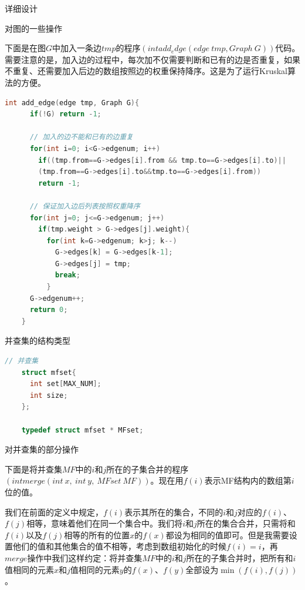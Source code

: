 \documentclass[UTF8]{ctexart}
\begin{document}
\begin{section}{详细设计}
\begin{subsection}{对图的一些操作}
\par{下面是在图$G$中加入一条边$tmp$的程序$(int add_edge(edge\ tmp, Graph\ G))$代码。需要注意的是，加入边的过程中，每次加不仅需要判断和已有的边是否重复，如果不重复、还需要加入后边的数组按照边的权重保持降序。这是为了运行Kruskal算法的方便。\\}

\begin{mdframed}[everyline=true]
\begin{lstlisting}[language=c]
    int add_edge(edge tmp, Graph G){
      if(!G) return -1;

      // 加入的边不能和已有的边重复
      for(int i=0; i<G->edgenum; i++)
        if((tmp.from==G->edges[i].from && tmp.to==G->edges[i].to)||
        (tmp.from==G->edges[i].to&&tmp.to==G->edges[i].from))
        return -1;

      // 保证加入边后列表按照权重降序
      for(int j=0; j<=G->edgenum; j++)
        if(tmp.weight > G->edges[j].weight){
          for(int k=G->edgenum; k>j; k--)
            G->edges[k] = G->edges[k-1];
            G->edges[j] = tmp;
            break;
          }
      G->edgenum++;
      return 0;
    }
\end{lstlisting}
\end{mdframed}

\end{subsection}

\begin{subsection}{并查集的结构类型}

\begin{mdframed}[everyline=true]
\begin{lstlisting}[language=c]
    // 并查集
    struct mfset{
      int set[MAX_NUM];
      int size;
    };

    typedef struct mfset * MFset;
\end{lstlisting}
\end{mdframed}

\end{subsection}



\begin{subsection}{对并查集的部分操作}
\par{下面是将并查集$MF$中的$i$和$j$所在的子集合并的程序$(int merge(int\ x,\ int\ y,\ MFset\ MF))$。现在用$f(i)$表示MF结构内的数组第$i$位的值。}
\par{我们在前面的定义中规定，$f(i)$表示其所在的集合，不同的$i$和$j$对应的$f(i)$、$f(j)$相等，意味着他们在同一个集合中。我们将$i$和$j$所在的集合合并，只需将和$f(i)$以及$f(j)$相等的所有的位置$x$的$f(x)$都设为相同的值即可。但是我需要设置他们的值和其他集合的值不相等，考虑到数组初始化的时候$f(i)=i$，再$merge$操作中我们这样约定：将并查集$MF$中的$i$和$j$所在的子集合并时，把所有和$i$值相同的元素$x$和$j$值相同的元素$y$的$f(x)$、$f(y)$全部设为$\min(f(i), f(j))$。\\}


\end{subsection}
\end{section}
\end{document}
